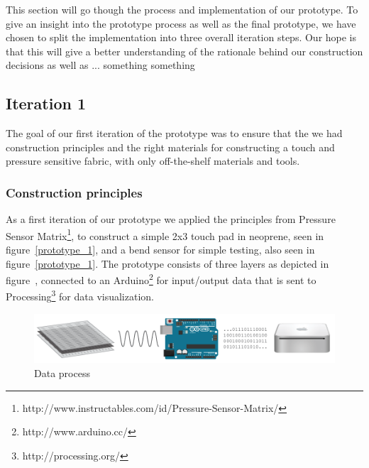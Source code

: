 This section will go though the process and implementation of our prototype.
To give an insight into the prototype process as well as the final prototype, we have chosen to split the implementation into three overall iteration steps.
Our hope is that this will give a better understanding of the rationale behind our construction decisions as well as ... something something 



\subsection{Iteration 1}
\label{ch:textiletouch:it1}
The goal of our first iteration of the prototype was to ensure that the we had construction principles and the right materials for constructing a touch and pressure sensitive fabric, with only off-the-shelf materials and tools.

\subsubsection{Construction principles}
As a first iteration of our prototype we applied the principles from Pressure Sensor Matrix\footnote{http://www.instructables.com/id/Pressure-Sensor-Matrix/}, to construct a simple 2x3 touch pad in neoprene, seen in figure~\ref{prototype_1}, and a bend sensor for simple testing, also seen in figure~\ref{prototype_1}.
The prototype consists of three layers as depicted in figure~, connected to an Arduino\footnote{http://www.arduino.cc/} for input/output data that is sent to Processing\footnote{http://processing.org/} for data visualization.

\begin{figure}[h]
  \centering
      \includegraphics[width=\textwidth]{figures/touch/process}
  \caption{Data process}
   \label{data-process}
\end{figure}

